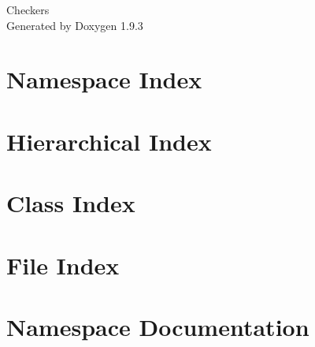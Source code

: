 \documentclass[twoside]{book}
\newcommand{\+}{\discretionary{\mbox{\scriptsize$\hookleftarrow$}}{}{}}
\newcommand{\clearemptydoublepage}{%
    \newpage{\pagestyle{empty}\cleardoublepage}%
  }
\begin{document}
  \raggedbottom
    \hypersetup{pageanchor=false,
                bookmarksnumbered=true,
                pdfencoding=unicode
               }
  \begin{titlepage}
  \vspace*{7cm}
  \begin{center}%
  {\Large Checkers}\\
  \vspace*{1cm}
  {\large Generated by Doxygen 1.9.3}\\
  \end{center}
  \end{titlepage}
  \clearemptydoublepage
  \tableofcontents
  \clearemptydoublepage
  \hypersetup{pageanchor=true}
\chapter{Namespace Index}

\chapter{Hierarchical Index}

\chapter{Class Index}

\chapter{File Index}

\chapter{Namespace Documentation}


\end{document}
